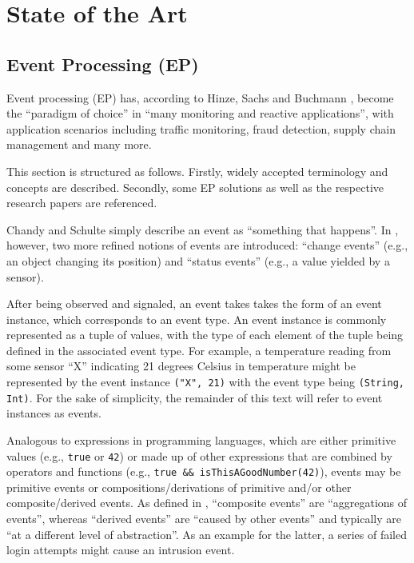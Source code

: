 \documentclass[article, type=bsc, colorback, accentcolor=tud8b, parskip=half, bibliography=totocnumbered]{tudthesis}
\begin{document}
\newpage

\section{State of the Art}
\label{sec:state_of_the_art}

\subsection{Event Processing (EP)}
\label{sec:event_processing}

Event processing (EP) has, according to Hinze, Sachs and Buchmann \cite{Hinze:2009:EAE:1619258.1619260}, become the ``paradigm of choice'' in ``many monitoring and reactive applications'', with application scenarios including traffic monitoring, fraud detection, supply chain management and many more.

This section is structured as follows.
Firstly, widely accepted terminology and concepts are described. Secondly, some EP solutions as well as the respective research papers are referenced.

Chandy and Schulte \cite{Chandy:2009:EPD:1594754} simply describe an event as ``something that happens''.
In \cite{Hinze:2009:EAE:1619258.1619260}, however, two more refined notions of events are introduced: ``change events'' (e.g., an object changing its position) and ``status events'' (e.g., a value yielded by a sensor).

After being observed and signaled, an event takes takes the form of an event instance, which corresponds to an event type.
An event instance is commonly represented as a tuple of values, with the type of each element of the tuple being defined in the associated event type.
For example, a temperature reading from some sensor ``X'' indicating 21 degrees Celsius in temperature might be represented by the event instance \lstinline{("X", 21)} with the event type being \lstinline{(String, Int)}.
For the sake of simplicity, the remainder of this text will refer to event instances as events.

Analogous to expressions in programming languages, which are either primitive values (e.g., \lstinline{true} or \lstinline{42}) or made up of other expressions that are combined by operators and functions (e.g., \lstinline{true && isThisAGoodNumber(42)}), events may be primitive events or compositions/derivations of primitive and/or other composite/derived events.
As defined in \cite{Hinze:2009:EAE:1619258.1619260}, ``composite events'' are ``aggregations of events'', whereas ``derived events'' are ``caused by other events'' and typically are ``at a different level of abstraction''.
As an example for the latter, a series of failed login attempts might cause an intrusion event.
\end{document}
